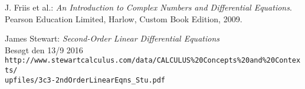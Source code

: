 \begin{thebibliography}{10}
J. Friis et al.: 
\textit{An Introduction to Complex Numbers and Differential Equations}. \\
Pearson Education Limited, Harlow, Custom Book Edition, 2009.

James Stewart:
\textit{Second-Order Linear Differential Equations} \\
Besøgt den 13/9 2016\\
\texttt{http://www.stewartcalculus.com/data/CALCULUS\%20Concepts\%20and\%20Contexts/\\upfiles/3c3-2ndOrderLinearEqns\_Stu.pdf}
\end{thebibliography}